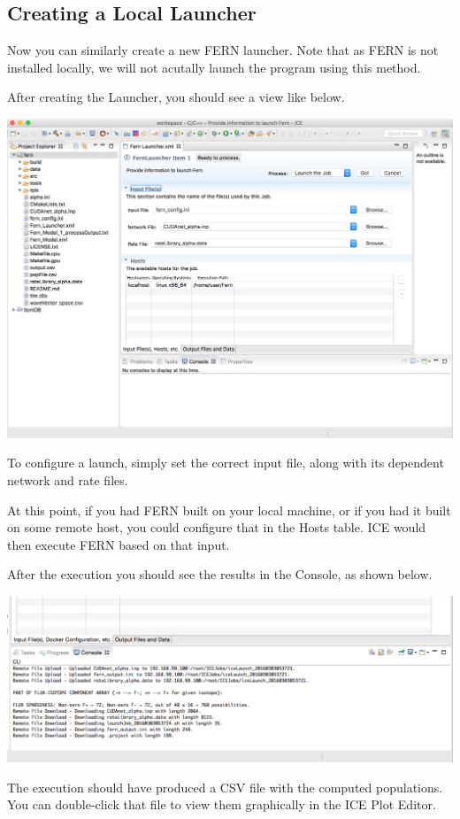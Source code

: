 \subsection{Creating a Local Launcher}

Now you can similarly create a new FERN launcher. Note that as FERN is not
installed locally, we will not acutally launch the program using this method.

After creating the Launcher,
you should see a view like below. 
\begin{center} \includegraphics[width=\textwidth]{figures/launcher}
\end{center}
To configure a launch, simply set the correct
input file, along with its dependent network and rate files. 

At this point, if you had FERN built on your local machine, or if you had it
built on some remote host, you could configure that in the Hosts table. ICE
would then execute FERN based on that input. 

After the execution you should see the results in the Console, as shown below.
\begin{center} \includegraphics[width=\textwidth]{figures/launcherResult}
\end{center}
The execution should have produced a CSV file with the computed populations. You
can double-click that file to view them graphically in the ICE Plot Editor. 


